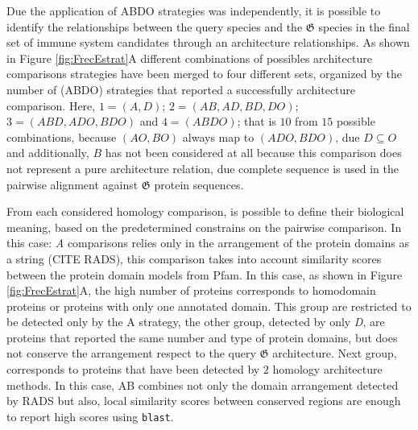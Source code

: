 \documentclass[11pt]{article}
\begin{document}
Due the application of ABDO strategies was independently, it is possible to 
identify the relationships between the query species and the 
$\boldsymbol{\mathfrak{G}}$ species in the final set of immune system 
candidates through an architecture relationships. As shown in Figure 
\ref{fig:FrecEstrat}A different combinations of possibles architecture 
comparisons strategies have been merged to four different sets, organized by the 
number of (ABDO) strategies that reported a successfully architecture 
comparison. Here, $1 = (A, D)$; $2 = (AB, AD, BD, DO)$; $3 = (ABD, ADO, BDO)$ 
and $4 = (ABDO)$; that is $10$ from $15$ possible combinations, because $(AO, 
BO)$ always map to $(ADO, BDO)$, due $D \subseteq O$ and additionally, $B$ has 
not been considered at all because this comparison does not represent a pure 
architecture relation, due complete sequence is used in the pairwise alignment 
against $\boldsymbol{\mathfrak{G}}$ protein sequences. 

From each considered homology comparison, is possible to define their biological
meaning, based on the predetermined constrains on the pairwise comparison. In this
case: \textsl{A} comparisons relies only in the arrangement of the protein domains as a 
string \cite{} (CITE RADS), this comparison takes into account similarity scores
between the protein domain models from Pfam. In this case, as shown in Figure
\ref{fig:FrecEstrat}A, the high number of proteins corresponds to homodomain proteins
or proteins with only one annotated domain. This group are restricted to be detected
only by the A strategy, the other group, detected by only \textsl{D}, are proteins 
that reported the same number and type of protein domains, but does not conserve 
the arrangement respect to the query $\boldsymbol{\mathfrak{G}}$ architecture.
Next group, corresponds to proteins that have been detected by $2$ homology 
architecture methods. In this case, AB combines not only the domain arrangement detected
by RADS but also, local similarity scores between conserved regions are enough to report
high scores using \texttt{blast}.
\end{document}
